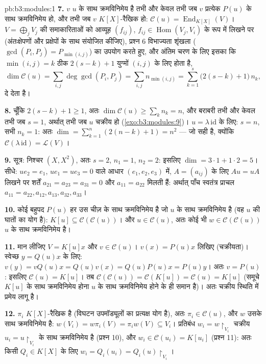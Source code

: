 \begin{solution}{pb:b3:modules:1}
\textbf{7.} $v$ $u$ के साथ क्रमविनिमेय है तभी और केवल तभी जब
$v$ प्रत्येक $P(u)$ के साथ क्रमविनिमेय हो, और तभी जब $v$
$K[X]$-रैखिक हो: $\mathcal C(u) =
\operatorname{End}_{K[X]}(V)$। $V =
\bigoplus_j V_j$ की समाकारिताओं को आव्यूह $(f_{ij})$, $f_{ij} \in
\operatorname{Hom}(V_j, V_i)$
के रूप में लिखने पर (अंतःक्षेपणों और प्रक्षेपों के साथ संयोजित
कीजिए), प्रश्न 6 विभाज्यता शृंखला ($\gcd(P_i, P_j) =
P_{\min(i,j)}$) का उपयोग करते हुए, और
अंतिम चरण के लिए इसका कि $\min(i,j) = k$ ठीक $2(s - k) + 1$ युग्मों $(i, j)$ के लिए होता
है,
\[
\dim \mathcal C(u) = \sum_{i,j} \deg\gcd(P_i, P_j)
= \sum_{i,j} n_{\min(i,j)}
= \sum_{k=1}^{s} \bigl(2(s - k) + 1\bigr)\,n_k ,
\]
दे देता है।

\textbf{8.} चूँकि $2(s-k)+1 \geq 1$, अतः $\dim\mathcal C(u) \geq
\sum_k n_k = n$, और बराबरी तभी और केवल तभी जब
$s = 1$, अर्थात् तभी जब $u$ चक्रीय हो (\cref{exo:b3:modules:9})। $u = \lambda\,\mathrm{id}$ के लिए: $s = n$,
सभी $n_k = 1$: अतः $\dim = \sum_{k=1}^n (2(n-k)+1) = n^2$ --- जो सही है, क्योंकि $\mathcal C(\lambda\,\mathrm{id}) = \mathcal
L(V)$।

\textbf{9.} सूत्र: निश्चर $(X, X^2)$, अतः $s = 2$, $n_1 =
1$, $n_2 = 2$: इसलिए
$\dim = 3\cdot1 + 1\cdot2 = 5$। सीधे: $u e_2 = e_1$, $ue_1 = ue_3 = 0$ वाले आधार $(e_1, e_2, e_3)$ में, $A = (a_{ij})$ के लिए $Au = uA$
लिखने पर शर्तें $a_{21} = a_{23} = a_{31} = 0$ और $a_{11} = a_{22}$ मिलती हैं: अर्थात् पाँच स्वतंत्र
प्राचल $a_{11}{=}a_{22}, a_{12}, a_{13}, a_{32}, a_{33}$।

\textbf{10.} कोई बहुपद $P(u)$ हर उस चीज़ के साथ क्रमविनिमेय है जो
$u$ के साथ क्रमविनिमेय है (वह $u$ की घातों का योग है): $K[u]
\subseteq \mathcal C(\mathcal C(u))$।
और $u \in \mathcal C(u)$, अतः कोई भी $w \in \mathcal C(\mathcal C(u))$ $u$ के साथ क्रमविनिमेय है।

\textbf{11.} मान लीजिए $V = K[u]x$ और $v \in \mathcal C(u)$। $v(x) = P(u)x$ लिखिए (चक्रीयता)।
स्वेच्छ $y = Q(u)x$ के लिए: $v(y) =
vQ(u)x = Q(u)v(x) = Q(u)P(u)x = P(u)y$। अतः $v = P(u)$: इसलिए $\mathcal
C(u) = K[u]$। तब $\mathcal C(\mathcal C(u)) = \mathcal
C(K[u]) = \mathcal C(u) = K[u]$ (समूचे
$K[u]$ के साथ क्रमविनिमेय होना $u$ के साथ क्रमविनिमेय होने के ही
समान है)। अतः चक्रीय स्थिति में प्रमेय लागू है।

\textbf{12.} $\pi_i$ $K[X]$-रैखिक है (विघटन उपमॉड्यूलों का प्रत्यक्ष
योग है), अतः $\pi_i \in \mathcal C(u)$, और $w$ उसके साथ क्रमविनिमेय है: $w(V_i) = w\pi_i(V) = \pi_i w(V) \subseteq
V_i$। प्रतिबंध
$w_i = w\restriction_{V_i}$ चक्रीय $u_i = u\restriction_{V_i}$ के साथ क्रमविनिमेय है (प्रश्न 10), और $w_i
\in \mathcal C(u_i) = K[u_i]$
(प्रश्न 11): अतः किसी $Q_i \in K[X]$ के लिए $w_i = Q_i(u_i) =
Q_i(u)\restriction_{V_i}$।


\end{solution}
